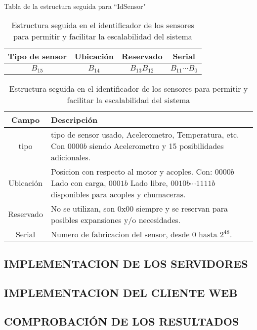     \begin{table}[h!]
        \begin{center}
            Tabla de la estructura seguida para ``IdSensor"\  \\

            \vspace{0.3cm}
            \begin{tabular}{|c|c|c|c|}
                \hline
                Tipo de sensor & Ubicación & Reservado  & Serial \\\hline
                $ B_{15} $ & $ B_{14} $  & $ B_{13}B_{12} $ & $ B_{11}\cdots B_{0} $\\
                \hline
            \end{tabular}

            \vspace{0.3cm}
            \begin{tabular}{|c|p{13cm}|}
                \hline
                Campo       & Descripción
                \\\hline\hline
                tipo        & tipo de sensor usado, Acelerometro, Temperatura, etc.
                Con $0000b$ siendo Acelerometro y 15 posibilidades adicionales.
                \\\hline
                Ubicación   & Posicion con respecto al motor y acoples. Con:
                $0000b$ Lado con carga, $ 0001b$ Lado libre, $ 0010b\cdots1111b $
                disponibles para acoples y chumaceras.
                \\\hline
                Reservado   & No se utilizan, son 0x00 siempre y se reservan para
                posibles expansiones y/o necesidades.
                \\\hline
                Serial      & Numero de fabricacion del sensor, desde 0 hasta $2^48$.
                \\\hline
            \end{tabular}
        \end{center}
        \caption[Estructura IdSensor]{Estructura seguida en el identificador de
        los sensores para permitir y facilitar la escalabilidad del sistema}
        \label{tab:CodIdSensor}
    \end{table}


 \newpage
\subsection{IMPLEMENTACION DE LOS SERVIDORES}

\subsection{IMPLEMENTACION DEL CLIENTE WEB}

\subsection{COMPROBACIÓN DE LOS RESULTADOS}

